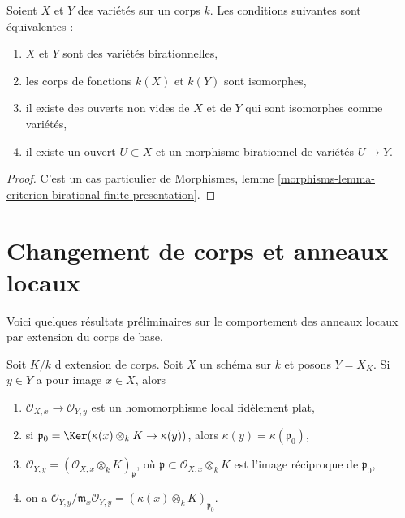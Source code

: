 \begin{lemma}
\label{lemma-birational-varieties}
Soient $X$ et $Y$ des variétés sur un corps $k$.
Les conditions suivantes sont équivalentes :
\begin{enumerate}
\item $X$ et $Y$ sont des variétés birationnelles,
\item les corps de fonctions $k(X)$ et $k(Y)$ sont isomorphes,
\item il existe des ouverts non vides de $X$ et de $Y$ qui sont
isomorphes comme variétés,
\item il existe un ouvert $U \subset X$ et un morphisme
birationnel de variétés $U \to Y$.
\end{enumerate}
\end{lemma}

\begin{proof}
C'est un cas particulier de Morphismes, lemme
\ref{morphisms-lemma-criterion-birational-finite-presentation}.
\end{proof}







\section{Changement de corps et anneaux locaux}
\label{section-local-rings}

\noindent
Voici quelques résultats préliminaires sur le comportement des
anneaux locaux par extension du corps de base.

\begin{lemma}
\label{lemma-change-fields-flat}
Soit $K/k$ d extension de corps. Soit $X$ un schéma sur $k$
et posons $Y = X_K$. Si $y \in Y$ a pour image $x \in X$, alors
\begin{enumerate}
\item $\mathcal{O}_{X, x} \to \mathcal{O}_{Y, y}$ est un
homomorphisme local fidèlement plat,
\item si $\mathfrak p_0 = \Ker(\kappa(x) \otimes_k K \to \kappa(y))$,
alors $\kappa(y) = \kappa(\mathfrak p_0)$,
\item $\mathcal{O}_{Y, y} =
(\mathcal{O}_{X, x} \otimes_k K)_\mathfrak p$, où
$\mathfrak p \subset \mathcal{O}_{X, x} \otimes_k K$ est l'image
réciproque de $\mathfrak p_0$,
\item on a
$\mathcal{O}_{Y, y}/\mathfrak m_x\mathcal{O}_{Y, y} =
(\kappa(x) \otimes_k K)_{\mathfrak p_0}$.
\end{enumerate}
\end{lemma}

